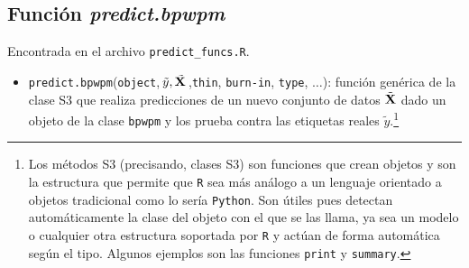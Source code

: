 \documentclass[../../Main/Main.tex]{subfiles}
\begin{document}
\subsection*{Función \textit{predict.bpwpm}}
Encontrada en el archivo \verb|predict_funcs.R|.
\begin{itemize}[label={}]
	\item \verb|predict.bpwpm|(\verb|object|,$\,\tilde{y},\tilde{\mathbf{X}\,}$,\verb|thin|, \verb|burn-in|, \verb|type|, $\ldots$): función genérica de la clase S3 que realiza predicciones de un nuevo conjunto de datos $\tilde{\mathbf{X}}$ dado un objeto de la clase \verb|bpwpm| y los prueba contra las etiquetas reales $\tilde{y}$.\footnote{Los métodos S3 (precisando, clases S3) son funciones que crean objetos y son la estructura que permite que \texttt{R} sea más análogo a un lenguaje orientado a objetos tradicional como lo sería \texttt{Python}. Son útiles pues detectan automáticamente la clase del objeto con el que se las llama, ya sea un modelo o cualquier otra estructura soportada por \texttt{R} y actúan de forma automática según el tipo. Algunos ejemplos son las funciones \texttt{print} y \texttt{summary}.}
\end{itemize}
\end{document}
